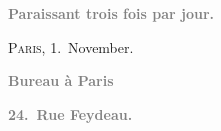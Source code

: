 \pstart
           \begin{otherlanguage}{french}\textcolor{gray}{\textbf{\textbf{Paraissant trois fois par jour.}}}\end{otherlanguage}\hfill \textsc{Paris}, 1. November.\pend
           
\pstart
           \begin{otherlanguage}{french}\textcolor{gray}{\textbf{\textbf{Bureau à Paris}}}\end{otherlanguage}\pend
           
\pstart
           \begin{otherlanguage}{french}\textcolor{gray}{\textbf{\textbf{24. Rue Feydeau.}}}\end{otherlanguage}\pend
           
